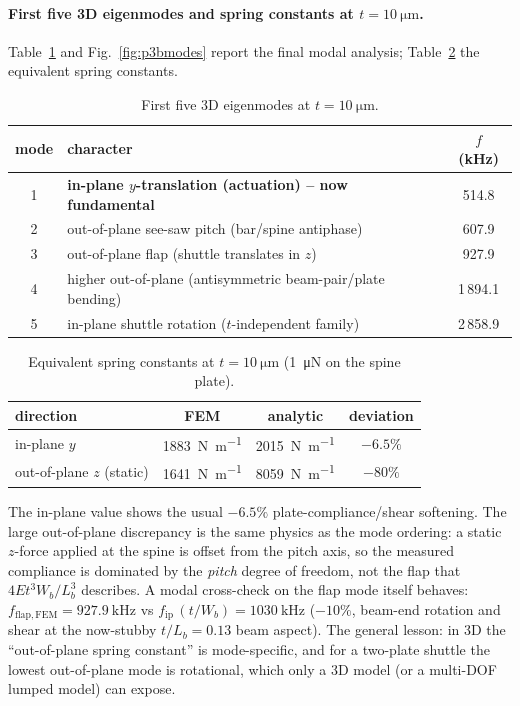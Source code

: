 \paragraph{First five 3D eigenmodes and spring constants at
$t=\SI{10}{\micro\meter}$.}
Table~\ref{tab:p3bmodes} and Fig.~\ref{fig:p3bmodes} report the final modal
analysis; Table~\ref{tab:p3bk} the equivalent spring constants.

\begin{table}[H]
\centering
\small
\caption{First five 3D eigenmodes at $t=\SI{10}{\micro\meter}$.}
\label{tab:p3bmodes}
\begin{tabular}{clc}
\toprule
mode & character & $f$ (\si{\kilo\hertz})\\
\midrule
1 & \textbf{in-plane $y$-translation (actuation) -- now fundamental} & 514.8\\
2 & out-of-plane see-saw pitch (bar/spine antiphase)                 & 607.9\\
3 & out-of-plane flap (shuttle translates in $z$)                    & 927.9\\
4 & higher out-of-plane (antisymmetric beam-pair/plate bending)      & 1\,894.1\\
5 & in-plane shuttle rotation ($t$-independent family)               & 2\,858.9\\
\bottomrule
\end{tabular}
\end{table}

\begin{table}[H]
\centering
\small
\caption{Equivalent spring constants at $t=\SI{10}{\micro\meter}$
(\SI{1}{\micro\newton} on the spine plate).}
\label{tab:p3bk}
\begin{tabular}{lccc}
\toprule
direction & FEM & analytic & deviation\\
\midrule
in-plane $y$              & \SI{1883}{\newton\per\meter} & \SI{2015}{\newton\per\meter} & $-6.5\%$\\
out-of-plane $z$ (static) & \SI{1641}{\newton\per\meter} & \SI{8059}{\newton\per\meter} & $-80\%$\\
\bottomrule
\end{tabular}
\end{table}

The in-plane value shows the usual $-6.5\%$ plate-compliance/shear softening.
The large out-of-plane discrepancy is the same physics as the mode ordering:
a static $z$-force applied at the spine is offset from the pitch axis, so the
measured compliance is dominated by the \emph{pitch} degree of freedom, not
the flap that $4Et^{3}W_{b}/L_{b}^{3}$ describes. A modal cross-check on the
flap mode itself behaves: $f_{\mathrm{flap,FEM}}=\SI{927.9}{\kilo\hertz}$ vs
$f_{\mathrm{ip}}\,(t/W_{b})=\SI{1030}{\kilo\hertz}$ ($-10\%$, beam-end
rotation and shear at the now-stubby $t/L_{b}=0.13$ beam aspect). The general
lesson: in 3D the ``out-of-plane spring constant'' is mode-specific, and for
a two-plate shuttle the lowest out-of-plane mode is rotational, which only a
3D model (or a multi-DOF lumped model) can expose.

